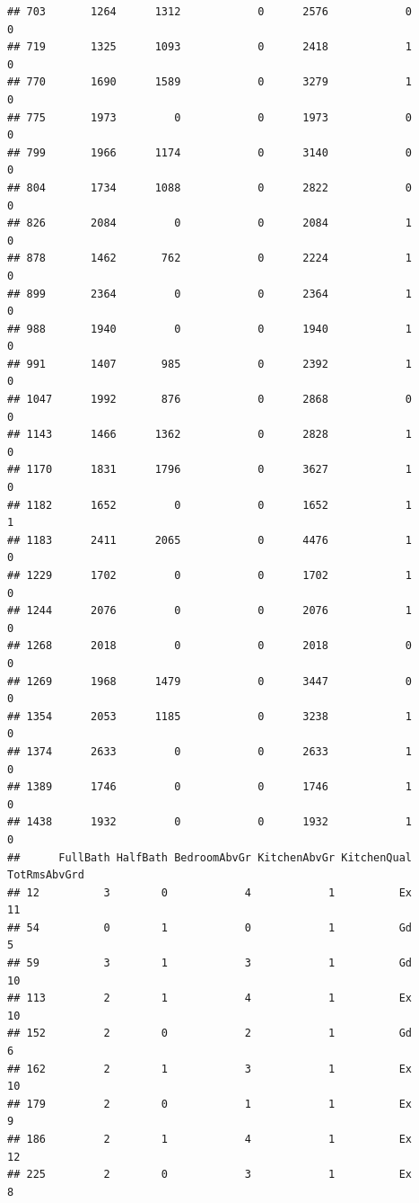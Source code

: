 \documentclass[]{article}
\begin{document}
\begin{verbatim}
## 703       1264      1312            0      2576            0            0
## 719       1325      1093            0      2418            1            0
## 770       1690      1589            0      3279            1            0
## 775       1973         0            0      1973            0            0
## 799       1966      1174            0      3140            0            0
## 804       1734      1088            0      2822            0            0
## 826       2084         0            0      2084            1            0
## 878       1462       762            0      2224            1            0
## 899       2364         0            0      2364            1            0
## 988       1940         0            0      1940            1            0
## 991       1407       985            0      2392            1            0
## 1047      1992       876            0      2868            0            0
## 1143      1466      1362            0      2828            1            0
## 1170      1831      1796            0      3627            1            0
## 1182      1652         0            0      1652            1            1
## 1183      2411      2065            0      4476            1            0
## 1229      1702         0            0      1702            1            0
## 1244      2076         0            0      2076            1            0
## 1268      2018         0            0      2018            0            0
## 1269      1968      1479            0      3447            0            0
## 1354      2053      1185            0      3238            1            0
## 1374      2633         0            0      2633            1            0
## 1389      1746         0            0      1746            1            0
## 1438      1932         0            0      1932            1            0
##      FullBath HalfBath BedroomAbvGr KitchenAbvGr KitchenQual TotRmsAbvGrd
## 12          3        0            4            1          Ex           11
## 54          0        1            0            1          Gd            5
## 59          3        1            3            1          Gd           10
## 113         2        1            4            1          Ex           10
## 152         2        0            2            1          Gd            6
## 162         2        1            3            1          Ex           10
## 179         2        0            1            1          Ex            9
## 186         2        1            4            1          Ex           12
## 225         2        0            3            1          Ex            8

\end{verbatim}
\end{document}

